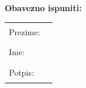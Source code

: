 \documentclass[12pt]{report}
\newcounter{cjelina}
\begin{document}
\begin{titlepage}
\Large{
\begin{center}
 \textbf{Obavezno ispuniti:\\}
\end{center}
\vspace{0.2cm}
\begin{center}
\begin{tabular}{l r}
Prezime: &\rule{6cm}{0.3mm}\\

Ime:  &\rule{6cm}{0.3mm}\\ 

Potpis:&\rule{6cm}{0.6mm}\\
\end{tabular}
\end{center}
}


\end{titlepage}



\end{document}
